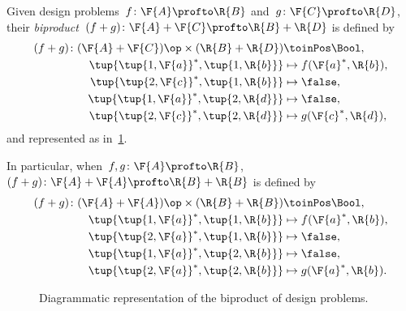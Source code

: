 \begin{definition}
    Given design problems~$f\colon \F{A} \profto \R{B}$ and~$g\colon \F{C} \profto \R{D}$, their \emph{biproduct}~$(f + g)\colon \F{A} + \F{C} \profto \R{B} + \R{D}$ is defined by
    \begin{equation}
        \begin{aligned}
        (f + g)
            \colon (\F{A} + \F{C})\op  \times (\R{B} + \R{D}) & \toinPos \Bool,  \\
            \tup{ \tup{1,\F{a}}^*, \tup{1,\R{b}}} & \mapsto f(\F{a}^*, \R{b}), \\
            \tup{ \tup{2,\F{c}}^*, \tup{1,\R{b}}} & \mapsto \false, \\
            \tup{ \tup{1,\F{a}}^*, \tup{2,\R{d}}} & \mapsto \false, \\
            \tup{ \tup{2,\F{c}}^*, \tup{2,\R{d}}} & \mapsto g(\F{c}^*, \R{d}),
        \end{aligned}
    \end{equation}
    and represented as in~\cref{fig:biproductdp}.

    In particular, when~$f, g\colon \F{A} \profto \R{B}$,~$(f + g)\colon \F{A} + \F{A} \profto \R{B} + \R{B}$ is defined by
    \begin{equation}
        \begin{aligned}
        (f + g)
            \colon (\F{A} + \F{A})\op  \times (\R{B} + \R{B}) & \toinPos \Bool,  \\
            \tup{ \tup{1, \F{a}}^*, \tup{1, \R{b}}} & \mapsto f(\F{a}^*, \R{b}), \\
            \tup{ \tup{2, \F{a}}^*, \tup{1, \R{b}}} & \mapsto \false, \\
            \tup{ \tup{1, \F{a}}^*, \tup{2, \R{b}}} & \mapsto \false, \\
            \tup{ \tup{2, \F{a}}^*, \tup{2, \R{b}}} & \mapsto g(\F{a}^*, \R{b}).
        \end{aligned}
    \end{equation}
\end{definition}

\begin{figure}[h!]
    \begin{center}
    \end{center}
    \caption{Diagrammatic representation of the biproduct of design problems. \label{fig:biproductdp}}
\end{figure}



